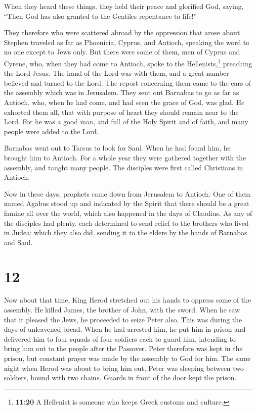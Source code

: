  When they heard these things, they held their peace and
glorified God, saying, ``Then God has also granted to the Gentiles
repentance to life!''

 They therefore who were scattered abroad by the
oppression that arose about Stephen traveled as far as Phoenicia,
Cyprus, and Antioch, speaking the word to no one except to Jews only.
 But there were some of them, men of Cyprus and Cyrene,
who, when they had come to Antioch, spoke to the Hellenists,\footnote{\textbf{11:20}
  A Hellenist is someone who keeps Greek customs and culture.} preaching
the Lord Jesus.  The hand of the Lord was with them, and
a great number believed and turned to the Lord.  The
report concerning them came to the ears of the assembly which was in
Jerusalem. They sent out Barnabas to go as far as Antioch,
 who, when he had come, and had seen the grace of God,
was glad. He exhorted them all, that with purpose of heart they should
remain near to the Lord.  For he was a good man, and full
of the Holy Spirit and of faith, and many people were added to the Lord.

 Barnabas went out to Tarsus to look for Saul.
 When he had found him, he brought him to Antioch. For a
whole year they were gathered together with the assembly, and taught
many people. The disciples were first called Christians in Antioch.

 Now in these days, prophets came down from Jerusalem to
Antioch.  One of them named Agabus stood up and indicated
by the Spirit that there should be a great famine all over the world,
which also happened in the days of Claudius.  As any of
the disciples had plenty, each determined to send relief to the brothers
who lived in Judea;  which they also did, sending it to
the elders by the hands of Barnabas and Saul.

\hypertarget{section-11}{%
\section{12}\label{section-11}}

 Now about that time, King Herod stretched out his hands
to oppress some of the assembly.  He killed James, the
brother of John, with the sword.  When he saw that it
pleased the Jews, he proceeded to seize Peter also. This was during the
days of unleavened bread.  When he had arrested him, he
put him in prison and delivered him to four squads of four soldiers each
to guard him, intending to bring him out to the people after the
Passover.  Peter therefore was kept in the prison, but
constant prayer was made by the assembly to God for him. 
The same night when Herod was about to bring him out, Peter was sleeping
between two soldiers, bound with two chains. Guards in front of the door
kept the prison.

